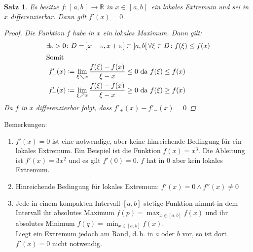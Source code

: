 \documentclass[ngerman,titlepage,twoside, parskip=half*]{scrreprt}
\newcommand*{\R}{\mathbb{R}}
\theoremstyle{break}
\newtheorem{theorem}{Satz}[section]
\theoremstyle{nonumberbreak}
\newtheorem{proof}{Beweis:}
\newcommand*{\bsofint}[1]{\mathopen{]}#1\mathclose{[}} %
\begin{document}
\begin{theorem}\label{satz:lokExtremum}
  Es besitze $f\colon\bsofint{a,b}\rightarrow\R$ in $x\in
  \bsofint{a,b}$ ein lokales Extremum
  und sei in $x$ differenzierbar. Dann gilt $f'(x)=0$.
  \begin{proof}
    Die Funktion $f$ habe in $x$ ein lokales Maximum. Dann gilt:
    \begin{align*}
      \exists\varepsilon>0 &\colon D=
      \bsofint{x-\varepsilon,x+\varepsilon} \subset\bsofint{a,b}\,\forall\xi\in D\colon f(\xi)\leq f(x)\\
      \intertext{Somit}
    f'_+(x) &\coloneqq \lim_{\xi\searrow x}\frac{f(\xi)-f(x)}{\xi-x}\leq 0 \text{ da } f(\xi)\leq f(x)\\
    f'_-(x) &\coloneqq \lim_{\xi\nearrow x}\frac{f(\xi)-f(x)}{\xi-x}\geq 0 \text{ da } f(\xi)\geq f(x)
  \end{align*}
  Da $f$ in $x$ differenzierbar folgt, dass $f'_+(x)-f'_-(x)=0$
  \end{proof}
\end{theorem}

Bemerkungen:
\begin{enumerate}[(1)]
  \item $f'(x)=0$ ist eine notwendige, aber keine hinreichende 
    Bedingung für ein lokales Extremum. Ein Beispiel ist die Funktion
    $f(x)=x^3$. Die Ableitung ist $f'(x)=3x^2$ und es gilt $f'(0)=0$.
    $f$ hat in 0 aber kein lokales Extremum.
  \item Hinreichende Bedingung für lokales Extremum: $f'(x)=0\wedge f''(x)\neq 0$
  \item Jede in einem kompakten Intervall $[a,b]$ stetige Funktion nimmt
    in dem Intervall ihr absolutes Maximum $f(p)=\max_{x\in[a,b]}f(x)$
    und ihr absolutes Minimum $f(q)=\min_{x\in[a,b]}f(x)$.\\
    Liegt ein Extremum jedoch am Rand, d.\,h. in $a$ oder $b$ vor, so ist
    dort $f'(x)=0$ nicht notwendig.
\end{enumerate}
\end{document}
